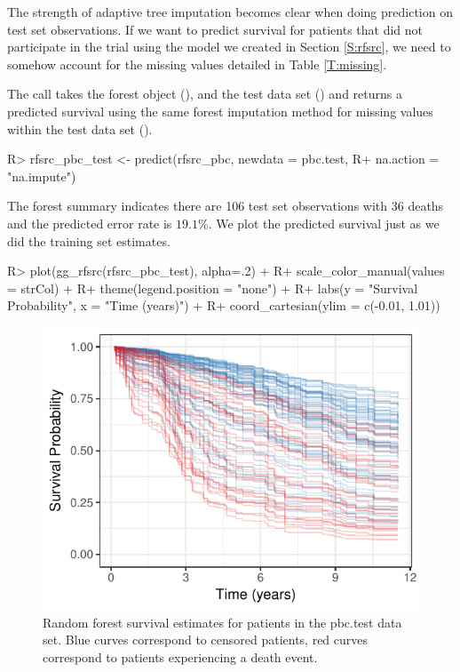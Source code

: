 \documentclass[article]{jss}
\begin{document}
The strength of adaptive tree imputation becomes clear when doing
prediction on test set observations. If we want to predict survival for
patients that did not participate in the trial using the model we
created in Section \ref{S:rfsrc}, we need to somehow account for the
missing values detailed in Table \ref{T:missing}.

The  call takes the forest object
(), and the test data set () and returns
a predicted survival using the same forest imputation method for missing
values within the test data set ().

\begin{Schunk}
\begin{Sinput}
R> rfsrc_pbc_test <- predict(rfsrc_pbc, newdata = pbc.test,
R+                           na.action = "na.impute")
\end{Sinput}
\end{Schunk}

The forest summary indicates there are 106 test set observations with 36
deaths and the predicted error rate is \(19.1\%\). We plot the predicted
survival just as we did the training set estimates.

\begin{Schunk}
\begin{Sinput}
R> plot(gg_rfsrc(rfsrc_pbc_test), alpha=.2) +
R+   scale_color_manual(values = strCol) +
R+   theme(legend.position = "none") +
R+   labs(y = "Survival Probability", x = "Time (years)") +
R+   coord_cartesian(ylim = c(-0.01, 1.01))
\end{Sinput}
\begin{figure}[!htb]

{\centering \includegraphics{fig-rfs/rfs-predictPlot-1} 

}

\caption[Random forest survival estimates for patients in the pbc.test data set]{Random forest survival estimates for patients in the pbc.test data set. Blue curves correspond to censored patients, red curves correspond to patients experiencing a death event.}\label{fig:predictPlot}
\end{figure}
\end{Schunk}
\end{document}
